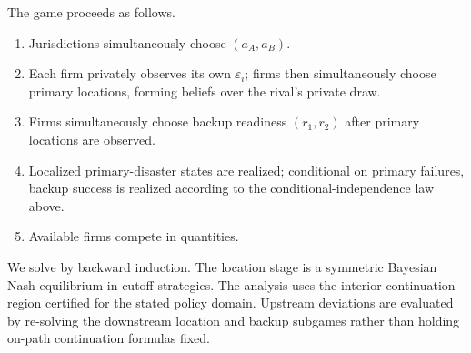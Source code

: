 The game proceeds as follows.
\begin{enumerate}[label=\arabic*.]
\item Jurisdictions simultaneously choose $(a_A,a_B)$.
\item Each firm privately observes its own $\varepsilon_i$; firms then simultaneously choose primary locations, forming beliefs over the rival's private draw.
\item Firms simultaneously choose backup readiness $(r_1,r_2)$ after primary locations are observed.
\item Localized primary-disaster states are realized; conditional on primary failures, backup success is realized according to the conditional-independence law above.
\item Available firms compete in quantities.
\end{enumerate}
We solve by backward induction. The location stage is a symmetric Bayesian Nash equilibrium in cutoff strategies. The analysis uses the interior continuation region certified for the stated policy domain. Upstream deviations are evaluated by re-solving the downstream location and backup subgames rather than holding on-path continuation formulas fixed.
